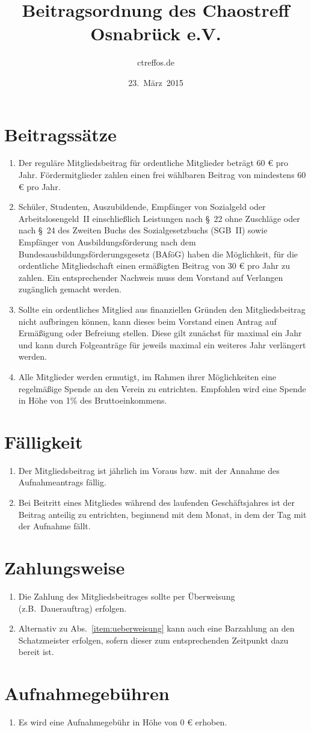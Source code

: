 \documentclass[a4paper,12pt]{scrartcl}
\title{Beitragsordnung des Chaostreff Osnabrück e.V.}
\author{ctreffos.de}
\date{23.~März~2015}
\begin{document}
\maketitle

\section{Beitragssätze}
\begin{enumerate}
\item
Der reguläre Mitgliedsbeitrag für ordentliche Mitglieder beträgt 60 €
pro Jahr. Fördermitglieder zahlen einen frei wählbaren Beitrag von
mindestens 60 € pro Jahr.
\item
Schüler, Studenten, Auszubildende, Empfänger von Sozialgeld oder
Arbeitslosengeld~II einschließlich Leistungen nach §~22 ohne Zuschläge
oder nach §~24 des Zweiten Buchs des Sozialgesetzbuchs (SGB~II) sowie
Empfänger von Ausbildungsförderung nach dem
Bundesausbildungsförderungsgesetz (BAföG) haben die Möglichkeit, für
die ordentliche Mitgliedschaft einen ermäßigten Beitrag von 30 € pro
Jahr zu zahlen. Ein entsprechender Nachweis muss dem Vorstand auf
Verlangen zugänglich gemacht werden.
\item
Sollte ein ordentliches Mitglied aus finanziellen Gründen den
Mitgliedsbeitrag nicht aufbringen können, kann dieses beim Vorstand
einen Antrag auf Ermäßigung oder Befreiung stellen. Diese gilt
zunächst für maximal ein Jahr und kann durch Folgeanträge für jeweils
maximal ein weiteres Jahr verlängert werden.
\item
Alle Mitglieder werden ermutigt, im Rahmen ihrer Möglichkeiten eine
regelmäßige Spende an den Verein zu entrichten. Empfohlen wird eine
Spende in Höhe von 1\% des Bruttoeinkommens.
\end{enumerate}

\section{Fälligkeit}
\begin{enumerate}
\item Der Mitgliedsbeitrag ist jährlich im Voraus bzw. mit der Annahme des Aufnahmeantrags fällig.
\item Bei Beitritt eines Mitgliedes während des laufenden Geschäftsjahres ist der Beitrag anteilig zu entrichten, beginnend mit dem Monat, in dem der Tag mit der Aufnahme fällt.
\end{enumerate}

\section{Zahlungsweise}
\begin{enumerate}
\item\label{item:ueberweisung}
Die Zahlung des Mitgliedsbeitrages sollte per Überweisung (z.B.\
Dauerauftrag) erfolgen.
\item Alternativ zu Abs.~\ref{item:ueberweisung} kann auch eine Barzahlung
an den Schatzmeister erfolgen, sofern dieser zum entsprechenden
Zeitpunkt dazu bereit ist.
\end{enumerate}

\section{Aufnahmegebühren}
\begin{enumerate}
\item Es wird eine Aufnahmegebühr in Höhe von 0 € erhoben.
\end{enumerate}
\end{document}
